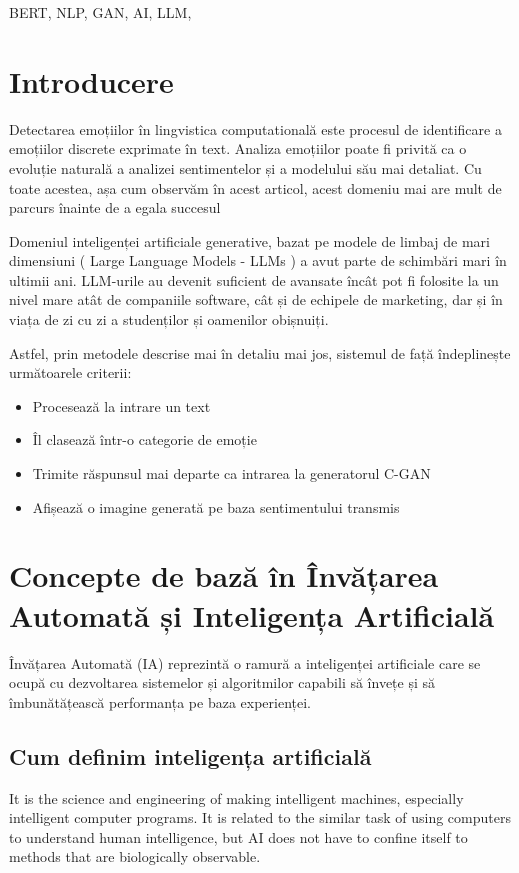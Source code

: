 \documentclass[conference]{IEEEtran}
\begin{document}
\begin{IEEEkeywords}
BERT, NLP, GAN, AI, LLM,
\end{IEEEkeywords}


\section{Introducere}

Detectarea emoțiilor în lingvistica computatională este procesul de identificare a emoțiilor 
discrete exprimate în text. Analiza emoțiilor poate fi privită ca o evoluție naturală a analizei 
sentimentelor și a modelului său mai detaliat. 
Cu toate acestea, așa cum observăm în acest articol, 
acest domeniu mai are mult de parcurs înainte de a egala succesul 


Domeniul inteligenței artificiale generative, bazat pe modele de limbaj de mari dimensiuni 
( Large Language Models - LLMs ) a avut parte de schimbări mari în ultimii ani. 
LLM-urile au devenit suficient de avansate încât pot fi folosite la un nivel mare
atât de companiile software, cât și de echipele de marketing, dar și în viața de zi cu zi a studenților și oamenilor obișnuiți. 


Astfel, prin metodele descrise mai în detaliu mai jos, sistemul de față îndeplinește următoarele criterii:
\begin{itemize}
	\item Procesează la intrare un text 
	\item Îl clasează într-o categorie de emoție
	\item Trimite răspunsul mai departe ca intrarea la generatorul C-GAN 
	\item Afișează o imagine generată pe baza sentimentului transmis
\end{itemize}


\section{Concepte de bază în Învățarea Automată și Inteligența Artificială}
Învățarea Automată (IA) reprezintă o ramură a inteligenței artificiale care se ocupă cu dezvoltarea sistemelor și 
algoritmilor capabili să învețe și să îmbunătățească performanța pe baza experienței.

\subsection{Cum definim inteligența artificială}
It is the science and engineering of making intelligent machines, especially intelligent computer programs. It is related to the similar task of using computers to understand human intelligence, but AI does not have to confine itself to methods that are biologically observable.
\end{document}
